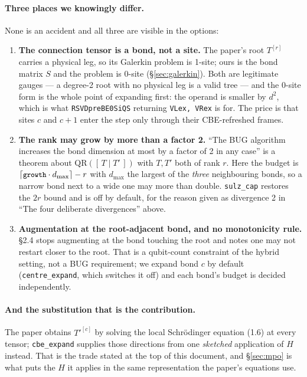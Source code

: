 \documentclass[11pt,a4paper]{article}
\newcommand{\code}[1]{\texttt{\small #1}}
\begin{document}
\paragraph{Three places we knowingly differ.} None is an accident and all three are visible in
the options:

\begin{enumerate}[leftmargin=1.6em]
\item \textbf{The connection tensor is a bond, not a site.} The paper's root $T^{[r]}$ carries a
  physical leg, so its Galerkin problem is 1-site; ours is the bond matrix $S$ and the problem is
  0-site (\S\ref{sec:galerkin}). Both are legitimate gauges --- a degree-2 root with no physical
  leg is a valid tree --- and the 0-site form is the whole point of expanding first: the operand
  is smaller by $d^2$, which is what \code{RSVDpreBE0SiQS} returning \code{VLex, VRex} is for.
  The price is that sites $c$ and $c+1$ enter the step only through their CBE-refreshed frames.
\item \textbf{The rank may grow by more than a factor 2.} ``The BUG algorithm increases the bond
  dimension at most by a factor of 2 in any case'' is a theorem about
  $\mathrm{QR}([\,T\mid T'\,])$ with $T,T'$ both of rank $r$. Here the budget is
  $\lceil\code{growth}\cdot d_{\max}\rceil - r$ with $d_{\max}$ the largest of the \emph{three}
  neighbouring bonds, so a narrow bond next to a wide one may more than double. \code{sulz\_cap}
  restores the $2r$ bound and is off by default, for the reason given as divergence 2 in
  ``The four deliberate divergences'' above.
\item \textbf{Augmentation at the root-adjacent bond, and no monotonicity rule.} \S2.4 stops
  augmenting at the bond touching the root and notes one may not restart closer to the root.
  That is a qubit-count constraint of the hybrid setting, not a BUG requirement; we expand bond
  $c$ by default (\code{centre\_expand}, which switches it off) and each bond's budget is decided
  independently.
\end{enumerate}

\paragraph{And the substitution that is the contribution.} The paper obtains $T'^{[c]}$ by
solving the local Schr\"odinger equation (1.6) at every tensor; \code{cbe\_expand} supplies those
directions from one \emph{sketched} application of $H$ instead. That is the trade stated at the
top of this document, and \S\ref{sec:mpo} is what puts the $H$ it applies in the same
representation the paper's equations use.
\end{document}
